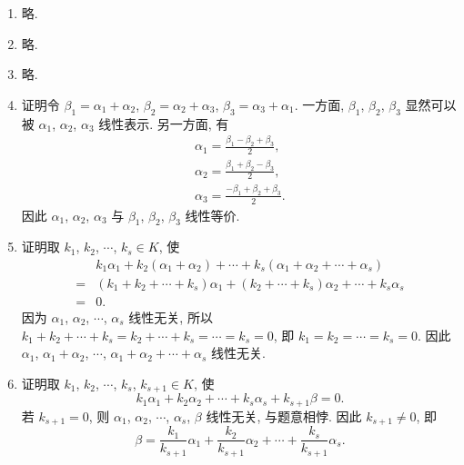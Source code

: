 % 
\begin{enumerate}
    \item %
        略.
    \item %
        略.
    \item %
        略.
    \item %
        {\heiti 证明}\quad 令 $\beta_1 = \alpha_1 + \alpha_2$, $\beta_2 = \alpha_2 + \alpha_3$, $\beta_3 = \alpha_3 + \alpha_1$.
        一方面, $\beta_1$, $\beta_2$, $\beta_3$ 显然可以被 $\alpha_1$, $\alpha_2$, $\alpha_3$ 线性表示.
        另一方面, 有
        \begin{gather*}
            \alpha_1 = \frac{\beta_1 - \beta_2 + \beta_3}{2}, \\
            \alpha_2 = \frac{\beta_1 + \beta_2 - \beta_3}{2}, \\
            \alpha_3 = \frac{-\beta_1 + \beta_2 + \beta_3}{2}.
        \end{gather*}
        因此 $\alpha_1$, $\alpha_2$, $\alpha_3$ 与 $\beta_1$, $\beta_2$, $\beta_3$ 线性等价.
    \item %
        {\heiti 证明}\quad 取 $k_1$, $k_2$, $\cdots$, $k_s \in K$, 使
        \begin{align*}
                & k_1\alpha_1 + k_2(\alpha_1 + \alpha_2) + \cdots + k_s(\alpha_1 + \alpha_2 + \cdots + \alpha_s) \\
            ={} & (k_1 + k_2 + \cdots + k_s)\alpha_1 + (k_2 + \cdots + k_s)\alpha_2 + \cdots + k_s\alpha_s \\
            ={} & 0.    
        \end{align*}
        因为 $\alpha_1$, $\alpha_2$, $\cdots$, $\alpha_s$ 线性无关, 所以 $k_1 + k_2 + \cdots + k_s = k_2 + \cdots + k_s = \cdots = k_s = 0$,
        即 $k_1 = k_2 = \cdots = k_s = 0$. 因此 $\alpha_1$, $\alpha_1 + \alpha_2$, $\cdots$, $\alpha_1 + \alpha_2 + \cdots + \alpha_s$ 线性无关.
    \item %
        {\heiti 证明}\quad 取 $k_1$, $k_2$, $\cdots$, $k_s$, $k_{s+1} \in K$, 使
        \[
            k_1\alpha_1 + k_2\alpha_2 + \cdots + k_s\alpha_s + k_{s+1}\beta = 0.    
        \]
        若 $k_{s+1} = 0$, 则 $\alpha_1$, $\alpha_2$, $\cdots$, $\alpha_s$, $\beta$ 线性无关, 与题意相悖. 因此 $k_{s+1} \neq 0$, 即
        \[
            \beta = \frac{k_1}{k_{s+1}}\alpha_1 + \frac{k_2}{k_{s+1}}\alpha_2 + \cdots + \frac{k_s}{k_{s+1}}\alpha_s.    
\]
\end{enumerate}
